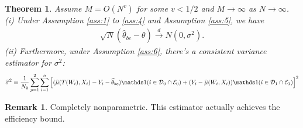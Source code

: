 \documentclass[11pt]{article}
\numberwithin{equation}{section}
\newtheorem{theorem}{Theorem}[section]
\theoremstyle{definition}
\newtheorem{remark}{Remark}[section]
\begin{document}
\begin{theorem}\label{thm:1} 
Assume $M=O(N^v)$ for some $v<1/2$ and $M\to\infty$ as $N\to\infty$. (i) Under Assumption \ref{ass:1} to \ref{ass:4} and Assumption \ref{ass:5}, we have
\begin{align}
    \sqrt{N}(\widehat{\theta}_{bc}-\theta)\overset{d}{\to} N(0,\sigma^2).   
\end{align}
(ii) Furthermore, under Assumption \ref{ass:6}, there's a consistent variance estimator for $\sigma^2$:
\begin{align*}
    \widehat{\sigma}^2=\frac{1}{N_0}\sum_{p=1}^2\sum_{i=1}^n\left[(\widehat{\mu}(T(W_i),X_i)-Y_i-\widehat{\theta}_{bc})\ind(i\in \mathcal{D}_0\cap\mathcal{E}_0)+(Y_i-\widehat{\mu}(W_i,X_i))\ind(i\in \mathcal{D}_1\cap\mathcal{E}_1)\right]^2
\end{align*}
\end{theorem}
\begin{remark}
    Completely nonparametric. This estimator actually achieves the efficiency bound.
\end{remark}
\end{document}
